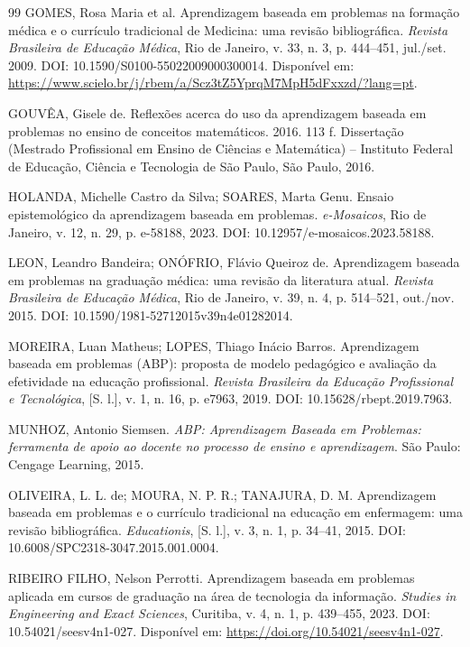\begin{thebibliography}{99}
GOMES, Rosa Maria et al. Aprendizagem baseada em problemas na formação médica e o currículo tradicional de Medicina: uma revisão bibliográfica. \textit{Revista Brasileira de Educação Médica}, Rio de Janeiro, v. 33, n. 3, p. 444--451, jul./set. 2009. DOI: 10.1590/S0100-55022009000300014. Disponível em: \url{https://www.scielo.br/j/rbem/a/Scz3tZ5YprqM7MpH5dFxxzd/?lang=pt}.

GOUVÊA, Gisele de. Reflexões acerca do uso da aprendizagem baseada em problemas no ensino de conceitos matemáticos. 2016. 113 f. Dissertação (Mestrado Profissional em Ensino de Ciências e Matemática) -- Instituto Federal de Educação, Ciência e Tecnologia de São Paulo, São Paulo, 2016.

HOLANDA, Michelle Castro da Silva; SOARES, Marta Genu. Ensaio epistemológico da aprendizagem baseada em problemas. \textit{e-Mosaicos}, Rio de Janeiro, v. 12, n. 29, p. e-58188, 2023. DOI: 10.12957/e-mosaicos.2023.58188.

LEON, Leandro Bandeira; ONÓFRIO, Flávio Queiroz de. Aprendizagem baseada em problemas na graduação médica: uma revisão da literatura atual. \textit{Revista Brasileira de Educação Médica}, Rio de Janeiro, v. 39, n. 4, p. 514--521, out./nov. 2015. DOI: 10.1590/1981-52712015v39n4e01282014.

MOREIRA, Luan Matheus; LOPES, Thiago Inácio Barros. Aprendizagem baseada em problemas (ABP): proposta de modelo pedagógico e avaliação da efetividade na educação profissional. \textit{Revista Brasileira da Educação Profissional e Tecnológica}, [S. l.], v. 1, n. 16, p. e7963, 2019. DOI: 10.15628/rbept.2019.7963.

MUNHOZ, Antonio Siemsen. \textit{ABP: Aprendizagem Baseada em Problemas: ferramenta de apoio ao docente no processo de ensino e aprendizagem}. São Paulo: Cengage Learning, 2015.

OLIVEIRA, L. L. de; MOURA, N. P. R.; TANAJURA, D. M. Aprendizagem baseada em problemas e o currículo tradicional na educação em enfermagem: uma revisão bibliográfica. \textit{Educationis}, [S. l.], v. 3, n. 1, p. 34--41, 2015. DOI: 10.6008/SPC2318-3047.2015.001.0004.

RIBEIRO FILHO, Nelson Perrotti. Aprendizagem baseada em problemas aplicada em cursos de graduação na área de tecnologia da informação. \textit{Studies in Engineering and Exact Sciences}, Curitiba, v. 4, n. 1, p. 439--455, 2023. DOI: 10.54021/seesv4n1-027. Disponível em: \url{https://doi.org/10.54021/seesv4n1-027}.


\end{thebibliography}
